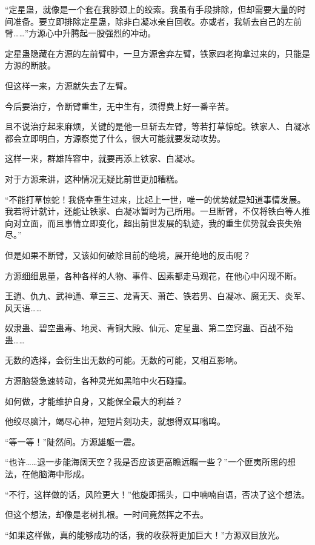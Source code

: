 
\begin{this_body}

“定星蛊，就像是一个套在我脖颈上的绞索。我虽有手段排除，但却需要大量的时间准备。要立即排除定星蛊，除非白凝冰亲自回收。亦或者，我斩去自己的左前臂……”方源心中升腾起一股强烈的冲动。

定星蛊隐藏在方源的左前臂中，一旦方源舍弃左臂，铁家四老拘拿过来的，只能是方源的断肢。

但这样一来，方源就失去了左臂。

今后要治疗，令断臂重生，无中生有，须得费上好一番辛苦。

且不说治疗起来麻烦，关键的是他一旦斩去左臂，等若打草惊蛇。铁家人、白凝冰都会立即明白，方源察觉了什么，很大可能就要发动攻势。

这样一来，群雄阵容中，就要再添上铁家、白凝冰。

对于方源来讲，这种情况无疑比前世更加糟糕。

“不能打草惊蛇！我侥幸重生过来，比起上一世，唯一的优势就是知道事情发展。我若将计就计，还能让铁家、白凝冰暂时为己所用。一旦断臂，不仅将铁白等人推向对立面，而且事情立即变化，超出前世发展的轨迹，我的重生优势就会丧失殆尽。”

但是如果不断臂，又该如何破除目前的绝境，展开绝地的反击呢？

方源细细思量，各种各样的人物、事件、因素都走马观花，在他心中闪现不断。

王逍、仇九、武神通、章三三、龙青天、萧芒、铁若男、白凝冰、魔无天、炎军、风天语……

奴隶蛊、碧空蛊毒、地灵、青铜大殿、仙元、定星蛊、第二空窍蛊、百战不殆蛊……

无数的选择，会衍生出无数的可能。无数的可能，又相互影响。

方源脑袋急速转动，各种灵光如黑暗中火石碰撞。

如何做，才能维护自身，又能保全最大的利益？

他绞尽脑汁，竭尽心神，短短片刻功夫，就想得双耳嗡鸣。

“等一等！”陡然间。方源雄躯一震。

“也许……退一步能海阔天空？我是否应该更高瞻远瞩一些？”一个匪夷所思的想法，在他脑海中形成。

“不行，这样做的话，风险更大！”他旋即摇头，口中喃喃自语，否决了这个想法。

但这个想法，却像是老树扎根。一时间竟然挥之不去。

“如果这样做，真的能够成功的话，我的收获将更加巨大！”方源双目放光。


\end{this_body}
